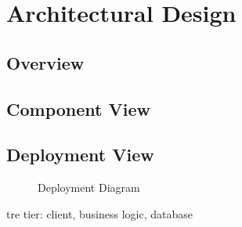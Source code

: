\documentclass[english]{article}
\begin{document}
\newpage

\section{Architectural Design}

\subsection{Overview}

\subsection{Component View}



\newpage
\subsection{Deployment View}

\begin{figure}[H]
	\centering
	\caption{Deployment Diagram}
	\label{deploymentdiagram}
\end{figure}

tre tier: client, business logic, database
\end{document}
